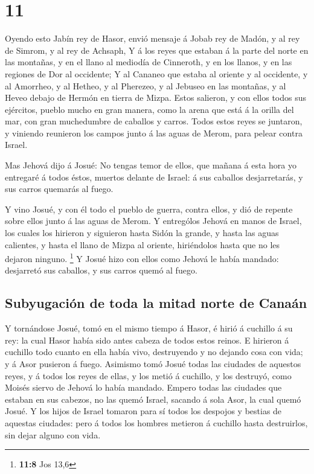 \hypertarget{section-10}{%
\section{11}\label{section-10}}

 Oyendo esto Jabín rey de Hasor, envió mensaje á Jobab rey
de Madón, y al rey de Simrom, y al rey de Achsaph,  Y á los
reyes que estaban á la parte del norte en las montañas, y en el llano al
mediodía de Cinneroth, y en los llanos, y en las regiones de Dor al
occidente;  Y al Cananeo que estaba al oriente y al
occidente, y al Amorrheo, y al Hetheo, y al Pherezeo, y al Jebuseo en
las montañas, y al Heveo debajo de Hermón en tierra de Mizpa.
 Estos salieron, y con ellos todos sus ejércitos, pueblo
mucho en gran manera, como la arena que está á la orilla del mar, con
gran muchedumbre de caballos y carros.  Todos estos reyes se
juntaron, y viniendo reunieron los campos junto á las aguas de Merom,
para pelear contra Israel.

 Mas Jehová dijo á Josué: No tengas temor de ellos, que
mañana á esta hora yo entregaré á todos éstos, muertos delante de
Israel: á sus caballos desjarretarás, y sus carros quemarás al fuego.

 Y vino Josué, y con él todo el pueblo de guerra, contra
ellos, y dió de repente sobre ellos junto á las aguas de Merom.
 Y entrególos Jehová en manos de Israel, los cuales los
hirieron y siguieron hasta Sidón la grande, y hasta las aguas calientes,
y hasta el llano de Mizpa al oriente, hiriéndolos hasta que no les
dejaron ninguno. \footnote{\textbf{11:8} Jos 13,6}  Y Josué
hizo con ellos como Jehová le había mandado: desjarretó sus caballos, y
sus carros quemó al fuego.

\hypertarget{subyugaciuxf3n-de-toda-la-mitad-norte-de-canauxe1n}{%
\subsection{Subyugación de toda la mitad norte de
Canaán}\label{subyugaciuxf3n-de-toda-la-mitad-norte-de-canauxe1n}}

 Y tornándose Josué, tomó en el mismo tiempo á Hasor, é
hirió á cuchillo á su rey: la cual Hasor había sido antes cabeza de
todos estos reinos.  E hirieron á cuchillo todo cuanto en
ella había vivo, destruyendo y no dejando cosa con vida; y á Asor
pusieron á fuego.  Asimismo tomó Josué todas las ciudades
de aquestos reyes, y á todos los reyes de ellas, y los metió á cuchillo,
y los destruyó, como Moisés siervo de Jehová lo había mandado.
 Empero todas las ciudades que estaban en sus cabezos, no
las quemó Israel, sacando á sola Asor, la cual quemó Josué.
 Y los hijos de Israel tomaron para sí todos los despojos y
bestias de aquestas ciudades: pero á todos los hombres metieron á
cuchillo hasta destruirlos, sin dejar alguno con vida.

